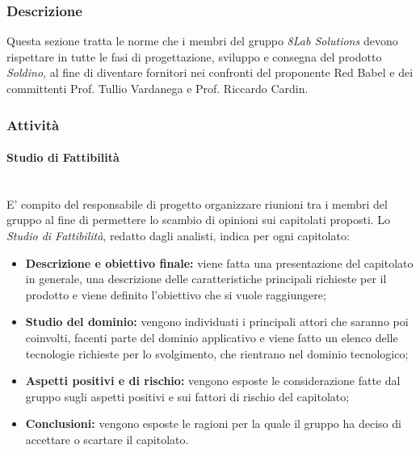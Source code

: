 	\subsubsection{Descrizione}
	Questa sezione tratta le norme che i membri del gruppo \textit{8Lab Solutions} devono rispettare in tutte le fasi di progettazione, sviluppo e consegna del prodotto \textit{Soldino}, al fine di diventare fornitori nei confronti del proponente Red Babel e dei committenti Prof. Tullio Vardanega e Prof. Riccardo Cardin.
	\subsubsection{Attività}
		\paragraph{Studio di Fattibilità} \mbox{}\\ 
		E' compito del responsabile di progetto organizzare riunioni tra i membri del gruppo al fine di permettere lo scambio di opinioni sui capitolati proposti.
		Lo \textit{Studio di Fattibilità}, redatto dagli analisti, indica per ogni capitolato:
		\begin{itemize}
			\item \textbf{Descrizione e obiettivo finale:} viene fatta una presentazione del capitolato in generale, una descrizione delle caratteristiche principali richieste per il prodotto e viene definito l'obiettivo che si vuole raggiungere;
			\item \textbf{Studio del dominio:} vengono individuati i principali attori che saranno poi coinvolti, facenti parte del dominio applicativo e viene fatto un elenco delle tecnologie richieste per lo svolgimento, che rientrano nel dominio tecnologico;
			\item \textbf{Aspetti positivi e di rischio:} vengono esposte le considerazione fatte dal gruppo sugli aspetti positivi e sui fattori di rischio del capitolato;
			\item \textbf{Conclusioni:} vengono esposte le ragioni per la quale il gruppo ha deciso di accettare o scartare il capitolato.
		\end{itemize}
